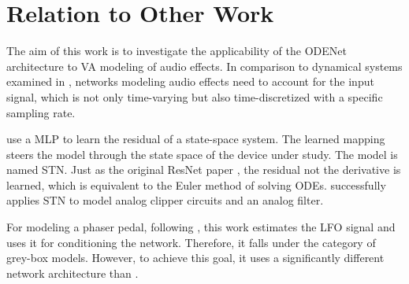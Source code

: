 \section{Relation to Other Work}
\label{sec:relation_to_other_work}
The aim of this work is to investigate the applicability of the ODENet architecture to \ac{VA} modeling of audio effects. In comparison to dynamical systems examined in \cite{Karlsson2019}, networks modeling audio effects need to account for the input signal, which is not only time-varying but also time-discretized with a specific sampling rate. 

\cite{Parker2019} use a \ac{MLP} to learn the residual of a state-space system. The learned mapping steers the model through the state space of the device under study. The model is named \ac{STN}. Just as the original \ac{ResNet} paper \cite{He2015}, the residual not the derivative is learned, which is equivalent to the Euler method of solving \acp{ODE}. \cite{Parker2019} successfully applies \ac{STN} to model analog clipper circuits and an analog filter.

For modeling a phaser pedal, following \cite{Wright2020}, this work estimates the \ac{LFO} signal and uses it for conditioning the network. Therefore, it falls under the category of grey-box models. However, to achieve this goal, it uses a significantly different network architecture than \cite{Wright2020}.

